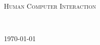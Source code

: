 \begin{titlepage}
  \centering
  {\scshape\Large Human Computer Interaction\par}
  \vspace{1.5cm}
  {\huge\bfseries \doctitle\par}
  \vspace{2cm}
  {\Large\itshape \docauthor\par}
  \vfill

  {\large \docaffiliation \\}
  {\large \today\par}
\end{titlepage}

